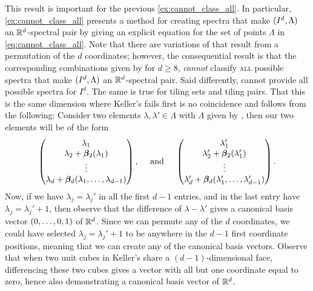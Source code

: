 \documentclass[../thesis.tex]{subfiles}
\begin{document}
This result is important for the previous \cref{ex:cannot_class_all}. In particular, \cref{ex:cannot_class_all} presents a method for creating spectra that make $(I^d,\Lambda)$ an $\mathbb{R}^d$-spectral pair by giving an explicit equation for the set of points $\Lambda$ in \cref{eq:cannot_class_all}. Note that there are variations of  that result from a permutation of the $d$ coordinates; however, the consequential result is that the corresponding combinations given by  for $d\geq8$, \emph{cannot} classify \textsc{all} possible spectra that make $(I^d,\Lambda)$ an $\mathbb{R}^d$-spectral pair. Said differently,  cannot provide all possible spectra for $I^d$. The same is true for tiling sets and tiling pairs. That this is the same dimension where Keller's  fails first is no coincidence and follows from the following: Consider two elements $\lambda,\lambda'\in \Lambda$ with $\Lambda$ given by , then our two elements will be of the form
\begin{equation*}
    \begin{pmatrix}
        \lambda_1\\
        \lambda_2+\bm{\beta}_2(\lambda_1)\\
        \vdots\\
        \lambda_d+\bm{\beta}_d(\lambda_1,\dots,\lambda_{d-1})\\
    \end{pmatrix},
    \quad \text{ and } \quad 
    \begin{pmatrix}
        \lambda_1'\\
        \lambda_2'+\bm{\beta}_2(\lambda_1')\\
        \vdots\\
        \lambda_d'+\bm{\beta}_d(\lambda_1',\dots,\lambda_{d-1}')\\
    \end{pmatrix}.
\end{equation*}
Now, if we have $\lambda_j=\lambda_j'$ in all the first $d-1$ entries, and in the last entry have $\lambda_j=\lambda_j'+1$, then observe that the difference of $\lambda-\lambda'$ gives a canonical basis vector $(0,\dots,0,1)$ of $\mathbb{R}^d$. Since we can permute any of the $d$ coordinates, we could have selected $\lambda_j=\lambda_j'+1$ to be anywhere in the $d-1$ first coordinate positions, meaning that we can create any of the canonical basis vectors. Observe that when two unit cubes in Keller's  share a $(d-1)$-dimensional face, differencing these two cubes gives a vector with all but one coordinate equal to zero, hence also demonstrating a canonical basis vector of $\mathbb{R}^d$. 
\end{document}
